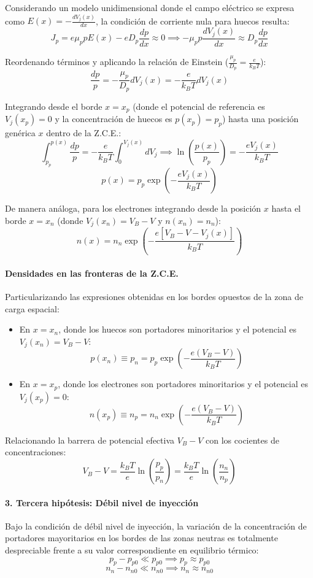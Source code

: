 Considerando un modelo unidimensional donde el campo eléctrico se expresa como $E(x) = -\frac{d V_j(x)}{dx}$, la condición de corriente nula para huecos resulta:
\[
J_p = e \mu_p p E(x) - e D_p \frac{dp}{dx} \approx 0 \implies -\mu_p p \frac{d V_j(x)}{dx} \approx D_p \frac{dp}{dx}
\]

Reordenando términos y aplicando la relación de Einstein ($\frac{\mu_p}{D_p} = \frac{e}{k_B T}$):
\[
\frac{dp}{p} = -\frac{\mu_p}{D_p} d V_j(x) = -\frac{e}{k_B T} d V_j(x)
\]

Integrando desde el borde $x = x_p$ (donde el potencial de referencia es $V_j(x_p) = 0$ y la concentración de huecos es $p(x_p) = p_p$) hasta una posición genérica $x$ dentro de la Z.C.E.:
\[
\int_{p_p}^{p(x)} \frac{dp}{p} = -\frac{e}{k_B T} \int_{0}^{V_j(x)} d V_j \implies \ln\left(\frac{p(x)}{p_p}\right) = -\frac{e V_j(x)}{k_B T}
\]
\[
p(x) = p_p \exp\left(-\frac{e V_j(x)}{k_B T}\right)
\]

De manera análoga, para los electrones integrando desde la posición $x$ hasta el borde $x = x_n$ (donde $V_j(x_n) = V_B - V$ y $n(x_n) = n_n$):
\[
n(x) = n_n \exp\left(-\frac{e [V_B - V - V_j(x)]}{k_B T}\right)
\]

\paragraph{Densidades en las fronteras de la Z.C.E.}
Particularizando las expresiones obtenidas en los bordes opuestos de la zona de carga espacial:
\begin{itemize}
    \item En $x = x_n$, donde los huecos son portadores minoritarios y el potencial es $V_j(x_n) = V_B - V$:
    \[
    p(x_n) \equiv p_n = p_p \exp\left(-\frac{e (V_B - V)}{k_B T}\right)
    \]
    \item En $x = x_p$, donde los electrones son portadores minoritarios y el potencial es $V_j(x_p) = 0$:
    \[
    n(x_p) \equiv n_p = n_n \exp\left(-\frac{e (V_B - V)}{k_B T}\right)
    \]
\end{itemize}

Relacionando la barrera de potencial efectiva $V_B - V$ con los cocientes de concentraciones:
\[
V_B - V = \frac{k_B T}{e} \ln\left(\frac{p_p}{p_n}\right) = \frac{k_B T}{e} \ln\left(\frac{n_n}{n_p}\right)
\]

\paragraph{3. Tercera hipótesis: Débil nivel de inyección}
Bajo la condición de débil nivel de inyección, la variación de la concentración de portadores mayoritarios en los bordes de las zonas neutras es totalmente despreciable frente a su valor correspondiente en equilibrio térmico:
\[
p_p - p_{p0} \ll p_{p0} \implies p_p \approx p_{p0}
\]
\[
n_n - n_{n0} \ll n_{n0} \implies n_n \approx n_{n0}
\]


